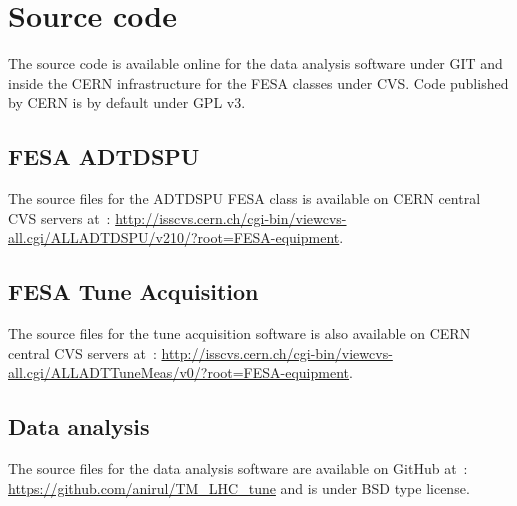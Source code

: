 \chapter{Source code}

The source code is available online for the data analysis software under GIT and inside the \gls{CERN} infrastructure for the \gls{FESA} classes under CVS. Code published by \gls{CERN} is by default under \gls{GPL} v3.

\section{FESA ADTDSPU}

The source files for the \gls{ADTDSPU} \gls{FESA} class is available on \gls{CERN} central \gls{CVS} servers at~: \url{http://isscvs.cern.ch/cgi-bin/viewcvs-all.cgi/ALLADTDSPU/v210/?root=FESA-equipment}.

\section{FESA Tune Acquisition}

The source files for the tune acquisition software is also available on \gls{CERN} central \gls{CVS} servers at~: \url{http://isscvs.cern.ch/cgi-bin/viewcvs-all.cgi/ALLADTTuneMeas/v0/?root=FESA-equipment}.

\section{Data analysis}

The source files for the data analysis software are available on GitHub at~: \url{https://github.com/anirul/TM\_LHC\_tune} and is under BSD type license.
